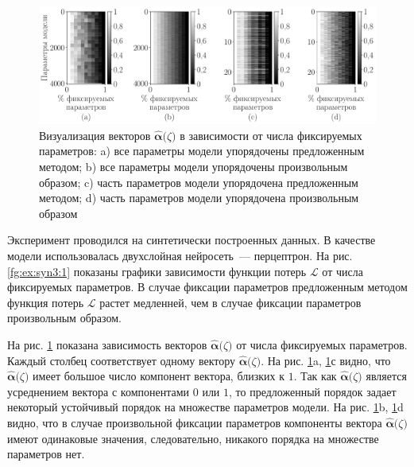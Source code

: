 \begin{figure}[h!t]\center
\includegraphics[width=1\textwidth]{results/order/generate_data_neural_matshow}
\caption{Визуализация векторов $\hat{\bm{\alpha}}\bigr(\zeta\bigr)$ в зависимости от числа фиксируемых параметров: a) все параметры модели упорядочены предложенным методом; b) все параметры модели упорядочены произвольным образом; c) часть параметров модели упорядочена предложенным методом; d) часть параметров модели упорядочена произвольным образом}
\label{fg:ex:syn3:2}
\end{figure}

Эксперимент проводился на синтетически построенных данных. В качестве модели использовалась двухслойная нейросеть~--- перцептрон.
На рис. \ref{fg:ex:syn3:1} показаны графики зависимости функции потерь $\mathcal{L}$ от числа фиксируемых параметров. В случае фиксации параметров предложенным методом функция потерь $\mathcal{L}$ растет медленней, чем в случае фиксации параметров произвольным образом.

На рис. \ref{fg:ex:syn3:2} показана зависимость векторов $\hat{\bm{\alpha}}\bigr(\zeta\bigr)$ от числа фиксируемых параметров. Каждый столбец соответствует одному вектору $\hat{\bm{\alpha}}\bigr(\zeta\bigr)$. На рис. \ref{fg:ex:syn3:2}a, \ref{fg:ex:syn3:2}с видно, что $\hat{\bm{\alpha}}\bigr(\zeta\bigr)$ имеет большое число компонент вектора, близких к $1$. Так как $\hat{\bm{\alpha}}\bigr(\zeta\bigr)$ является усреднением вектора с компонентами $0$ или $1$, то предложенный порядок задает некоторый устойчивый порядок на множестве параметров модели. На рис. \ref{fg:ex:syn3:2}b, \ref{fg:ex:syn3:2}d видно, что в случае произвольной фиксации параметров компоненты вектора $\hat{\bm{\alpha}}\bigr(\zeta\bigr)$ имеют одинаковые значения, следовательно, никакого порядка на множестве параметров нет.

